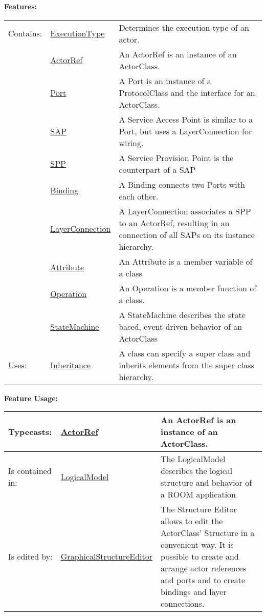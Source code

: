 		
	\begingroup
	\textbf{Features:}
	\renewcommand{\arraystretch}{1.8} %
	\begin{longtable}{l|l p{}}
		\hline
	Contains: & \tabitem \hyperlink{ref:ExecutionType}{ExecutionType}  & Determines the execution type of an actor.\\
	& \tabitem \hyperlink{ref:ActorRef}{ActorRef}  & An ActorRef is an instance of an ActorClass. \\
	& \tabitem \hyperlink{ref:Port}{Port}  & A Port is an instance of a ProtocolClass and the interface for an ActorClass. \\
	& \tabitem \hyperlink{ref:SAP}{SAP}  & A Service Access Point is similar to a Port, but uses a LayerConnection for wiring. \\
	& \tabitem \hyperlink{ref:SPP}{SPP}  & A Service Provision Point is the counterpart of a SAP \\
	& \tabitem \hyperlink{ref:Binding}{Binding}  & A Binding connects two Ports with each other. \\
	& \tabitem \hyperlink{ref:LayerConnection}{LayerConnection}  & A LayerConnection associates a SPP to an ActorRef, resulting in an connection of all SAPs on its instance hierarchy. \\
	& \tabitem \hyperlink{ref:Attribute}{Attribute}  & An Attribute is a member variable of a class \\
	& \tabitem \hyperlink{ref:Operation}{Operation}  & An Operation is a member function of a class. \\
	& \tabitem \hyperlink{ref:StateMachine}{StateMachine}  & A StateMachine describes the state based, event driven behavior of an ActorClass \\
	\hline
	Uses: & \tabitem \hyperlink{ref:Inheritance}{Inheritance}  & A class can specify a super class and inherits elements from the super class hierarchy.\\
	\hline
	\end{longtable}
	\endgroup
		
	\begingroup
	\textbf{Feature Usage:}
	\renewcommand{\arraystretch}{1.8} %
	\begin{longtable}{l|l p{}}
		\hline
	Typecasts: & \tabitem \hyperlink{ref:ActorRef}{ActorRef}  & An ActorRef is an instance of an ActorClass.\\
	\hline
	Is contained in: & \tabitem \hyperlink{ref:LogicalModel}{LogicalModel}  & The LogicalModel describes the logical structure and behavior of a ROOM application.\\
	\hline
	Is edited by: & \tabitem \hyperlink{ref:GraphicalStructureEditor}{GraphicalStructureEditor}  & The Structure Editor allows to edit the ActorClass' Structure in a convenient way. It is possible to create and arrange actor references and ports and to create bindings and layer connections.\\
	\hline
	\end{longtable}
	\endgroup
		
